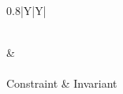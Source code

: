 \begin{table}[b]
\Large
\def\arraystretch{1.5}
\centering
\label{keyStruc}
\begin{tabularx}{0.8\textwidth}{|Y|Y|}%

\hline
{}  \\ \hline
\gecodesol      & \lssol       \\ \hline
{}    \\ \hline
Constraint      & Invariant    \\ \hline
{} \\ \hline
\end{tabularx}\caption{Ordering of key classes} \label{tab_architec}
\end{table}
\noindent